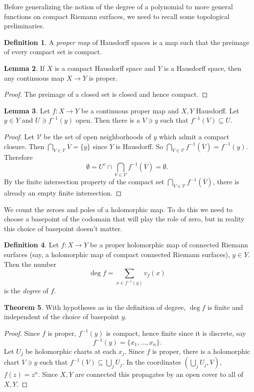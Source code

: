 \documentclass[12pt]{report}
\newcommand{\dfn}[1]{\emph{#1}\index{#1}}
\theoremstyle{definition}
\newtheorem{theorem}{Theorem}[chapter]
\newtheorem{lemma}[theorem]{Lemma}
\newtheorem{definition}[theorem]{Definition}
\begin{document}
Before generalizing the notion of the degree of a polynomial to more general functions on compact Riemann surfaces, we need to recall some topological preliminaries.
\begin{definition}
A \dfn{proper map} of Hausdorff spaces is a map such that the preimage of every compact set is compact.
\end{definition}
\begin{lemma}
If $X$ is a compact Hausdorff space and $Y$ is a Hausdorff space, then any continuous map $X \to Y$ is proper.
\end{lemma}
\begin{proof}
The preimage of a closed set is closed and hence compact.
\end{proof}
\begin{lemma}
Let $f: X \to Y$ be a continuous proper map and $X,Y$ Hausdorff. Let $y \in Y$ and $U \ni f^{-1}(y)$ open. Then there is a $V \ni y$ such that $f^{-1}(V) \subseteq U$.
\end{lemma}
\begin{proof}
Let $\mathcal V$ be the set of open neighborhoods of $y$ which admit a compact closure. Then $\bigcap_{V \in \mathcal V} \overline V = \{y\}$ since $Y$ is Hausdorff.
So $\bigcap_{V \in \mathcal V} f^{-1}(\overline V) = f^{-1}(y)$. Therefore
$$\emptyset = U^c \cap \bigcap_{V \in \mathcal V} f^{-1}(\overline V) = \emptyset.$$
By the finite intersection property of the compact set $\bigcap_{V \in \mathcal V} f^{-1}(\overline V)$, there is already an empty finite intersection.
\end{proof}
We count the zeroes and poles of a holomorphic map. To do this we need to choose a basepoint of the codomain that will play the role of zero, but in reality this choice of basepoint doesn't matter.
\begin{definition}
Let $f: X \to Y$ be a proper holomorphic map of connected Riemann surfaces (say, a holomorphic map of compact connected Riemann surfaces), $y \in Y$. Then the number
$$\deg f = \sum_{x \in f^{-1}(y)} v_f(x)$$
is the \dfn{degree} of $f$.
\end{definition}
\begin{theorem}
With hypotheses as in the definition of degree, $\deg f$ is finite and independent of the choice of basepoint $y$.
\end{theorem}
\begin{proof}
Since $f$ is proper, $f^{-1}(y)$ is compact, hence finite since it is discrete, say
$$f^{-1}(y) = \{x_1, \dots, x_n\}.$$
Let $U_j$ be holomorphic charts at each $x_j$. Since $f$ is proper, there is a holomorphic chart $V \ni y$ such that $f^{-1}(V) \subseteq \bigcup_j U_j$.
In the coordinates $(\bigcup_j U_j, V)$, $f(z) = z^n$.
Since $X,Y$ are connected this propagates by an open cover to all of $X,Y$.
\end{proof}
\end{document}
